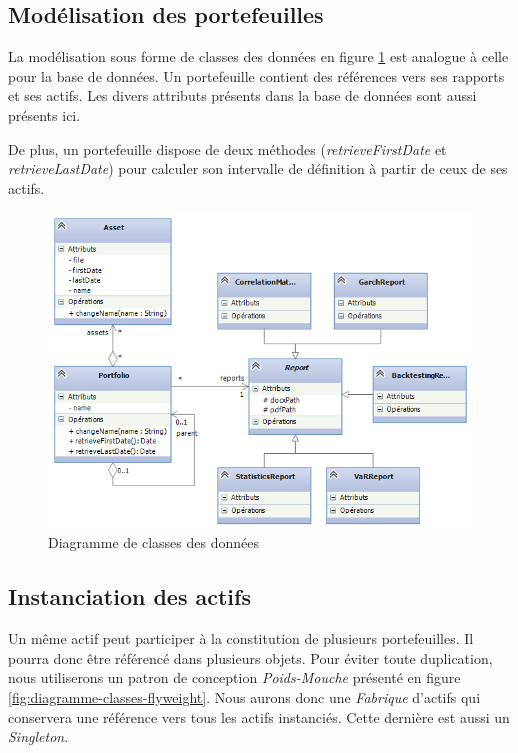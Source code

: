 \documentclass[a4paper,titlepage,french]{report}
\begin{document}
\subsection{Modélisation des portefeuilles}

La modélisation sous forme de classes des données en figure \ref{fig:diagramme-classes-donnees} est analogue à celle pour la base de données. Un portefeuille contient des références vers ses rapports et ses actifs. Les divers attributs présents dans la base de données sont aussi présents ici.

De plus, un portefeuille dispose de deux méthodes (\textit{retrieveFirstDate} et \textit{retrieveLastDate}) pour calculer son intervalle de définition à partir de ceux de ses actifs.

\begin{figure}
  	\center
  	\includegraphics[width=1\textwidth]{diagramme-classes-donnees.png}
  	\caption{Diagramme de classes des données}
  	\label{fig:diagramme-classes-donnees}
\end{figure}


\subsection{Instanciation des actifs}

Un même actif peut participer à la constitution de plusieurs portefeuilles.
Il pourra donc être référencé dans plusieurs objets.
Pour éviter toute duplication, nous utiliserons un patron de conception \textit{Poids-Mouche} présenté en figure \ref{fig:diagramme-classes-flyweight}.
Nous aurons donc une \textit{Fabrique} d'actifs qui conservera une référence vers tous les actifs instanciés. Cette dernière est aussi un \textit{Singleton}.
\end{document}
